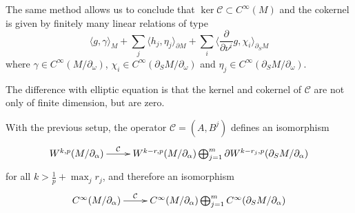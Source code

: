 The same method allows us to conclude that \(\ker \mathcal{C}\subset C^\infty(M)\) and
the cokernel is given by finitely many linear relations of type
\[
\langle g,\gamma \rangle_M + \sum_j \langle h_j,\eta_j \rangle_{\partial M} + \sum_i \langle
\frac{\partial}{\partial \nu^i} g ,\chi_i \rangle_{\partial_S M}
\]
where \(\gamma\in C^\infty (M/ \partial_\omega)\), \(\chi_i\in C^\infty(\partial_S M/
\partial_\omega)\) and \(\eta_j\in C^\infty(\partial_S M/ \partial_\omega)\).

The difference with elliptic equation is that the kernel and cokernel of \(\mathcal{C}\)
are not only of finite dimension, but are zero.

\begin{theorem}[Causality]
\label{thm:para-causality}
With the previous setup, the operator \(\mathcal{C}=(A, B^j)\) defines an isomorphism
\[
\xymatrix{
W^{k,p}(M/\partial_\alpha) \ar@{->}[r]^<<<<<{\mathcal{C}} & W^{k-r,p}(M/\partial_\alpha)\bigoplus_{j=1}^m \partial W^{k-r_j,p}(\partial_S M/\partial_\alpha)
}
\]
for all \(k > \frac{1}{p} + \max_j r_j\), and therefore an isomorphism
\[
 \xymatrix{
C^\infty(M/\partial_\alpha) \ar@{->}[r]^<<<<<{\mathcal{C}} & C^\infty(M/\partial_\alpha)\bigoplus_{j=1}^mC^\infty(\partial_S M/\partial_\alpha)
}
\]
\end{theorem}

